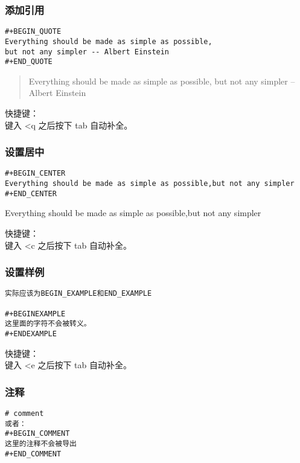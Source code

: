 \documentclass[11pt]{article}
\begin{document}
\subsubsection{添加引用}
\label{sec-2-4-2}

\begin{verbatim}
#+BEGIN_QUOTE
Everything should be made as simple as possible,
but not any simpler -- Albert Einstein
#+END_QUOTE
\end{verbatim}

\begin{quote}
Everything should be made as simple as possible,
but not any simpler -- Albert Einstein
\end{quote}
快捷键：\\
键入 <q 之后按下 tab 自动补全。

\subsubsection{设置居中}
\label{sec-2-4-3}

\begin{verbatim}
#+BEGIN_CENTER
Everything should be made as simple as possible,but not any simpler
#+END_CENTER
\end{verbatim}

\begin{center}
Everything should be made as simple as possible,but not any simpler
\end{center}
快捷键：\\
键入 <c 之后按下 tab 自动补全。

\subsubsection{设置样例}
\label{sec-2-4-4}

\begin{verbatim}
实际应该为BEGIN_EXAMPLE和END_EXAMPLE

#+BEGINEXAMPLE
这里面的字符不会被转义。
#+ENDEXAMPLE
\end{verbatim}
快捷键：\\
键入 <e 之后按下 tab 自动补全。
\subsubsection{注释}
\label{sec-2-4-5}

\begin{verbatim}
# comment
或者：
#+BEGIN_COMMENT
这里的注释不会被导出
#+END_COMMENT
\end{verbatim}
\end{document}
